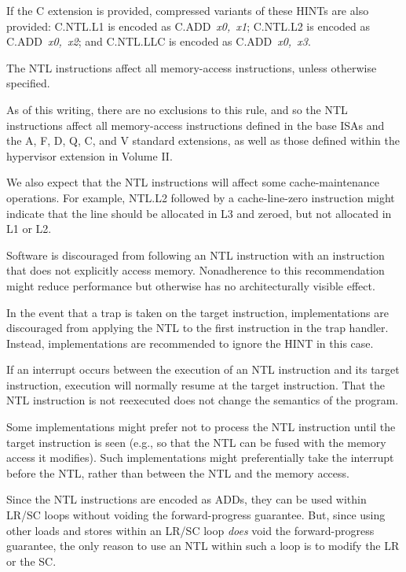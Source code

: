 If the C extension is provided, compressed variants of these HINTs are also
provided:
C.NTL.L1 is encoded as \mbox{C.ADD {\em x0, x1}};
C.NTL.L2 is encoded as \mbox{C.ADD {\em x0, x2}};
and C.NTL.LLC is encoded as \mbox{C.ADD {\em x0, x3}}.


The NTL instructions affect all memory-access instructions, unless otherwise
specified.

\begin{commentary}
As of this writing, there are no exclusions to this rule, and so
the NTL instructions affect all memory-access instructions
defined in the base ISAs and the A, F, D, Q, C, and V standard extensions,
as well as those defined within the hypervisor extension in Volume II.

We also expect that the NTL instructions will affect some cache-maintenance
operations.
For example, NTL.L2 followed by a cache-line-zero instruction might indicate
that the line should be allocated in L3 and zeroed, but not allocated in
L1 or L2.
\end{commentary}

Software is discouraged from following an NTL instruction with an
instruction that does not explicitly access memory.
Nonadherence to this recommendation might reduce performance but
otherwise has no architecturally visible effect.

In the event that a trap is taken on the target instruction,
implementations are discouraged from applying the NTL to the first instruction
in the trap handler.
Instead, implementations are recommended to ignore the HINT in this case.

\begin{commentary}
If an interrupt occurs between the execution of an NTL instruction and its
target instruction, execution will normally resume at the
target instruction.
That the NTL instruction is not reexecuted does not change the semantics of
the program.

Some implementations might prefer not to process the NTL instruction until the
target instruction is seen (e.g., so that the NTL can be
fused with the memory access it modifies).
Such implementations might preferentially take the interrupt before the NTL,
rather than between the NTL and the memory access.
\end{commentary}

\begin{commentary}
Since the NTL instructions are encoded as ADDs, they can be used within LR/SC
loops without voiding the forward-progress guarantee.
But, since using other loads and stores within an LR/SC loop {\em does}
void the forward-progress guarantee, the only reason to use an NTL
within such a loop is to modify the LR or the SC.
\end{commentary}
